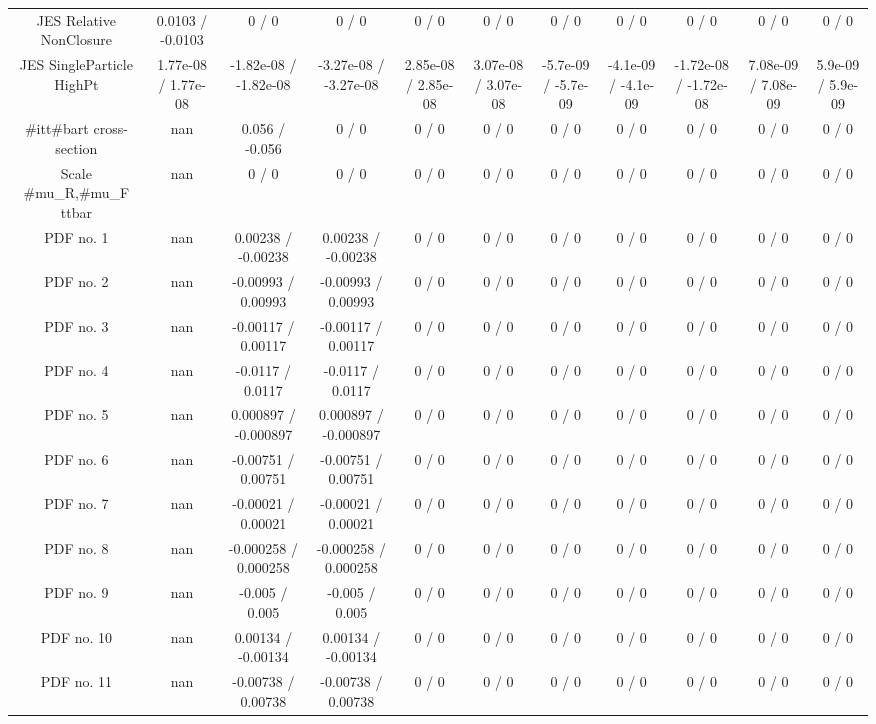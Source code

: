 \begin{table}[htbp]
\begin{center}
\begin{tabular}{|c|c|c|c|c|c|c|c|c|c|c|}
  JES Relative NonClosure & 0.0103 / -0.0103 & 0 / 0 & 0 / 0 & 0 / 0 & 0 / 0 & 0 / 0 & 0 / 0 & 0 / 0 & 0 / 0 & 0 / 0 \\ 
  JES SingleParticle HighPt & 1.77e-08 / 1.77e-08 & -1.82e-08 / -1.82e-08 & -3.27e-08 / -3.27e-08 & 2.85e-08 / 2.85e-08 & 3.07e-08 / 3.07e-08 & -5.7e-09 / -5.7e-09 & -4.1e-09 / -4.1e-09 & -1.72e-08 / -1.72e-08 & 7.08e-09 / 7.08e-09 & 5.9e-09 / 5.9e-09 \\ 
  #it{t#bar{t}} cross-section &    nan    & 0.056 / -0.056 & 0 / 0 & 0 / 0 & 0 / 0 & 0 / 0 & 0 / 0 & 0 / 0 & 0 / 0 & 0 / 0 \\ 
  Scale #mu_{R},#mu_{F} ttbar &    nan    & 0 / 0 & 0 / 0 & 0 / 0 & 0 / 0 & 0 / 0 & 0 / 0 & 0 / 0 & 0 / 0 & 0 / 0 \\ 
  PDF no. 1 &    nan    & 0.00238 / -0.00238 & 0.00238 / -0.00238 & 0 / 0 & 0 / 0 & 0 / 0 & 0 / 0 & 0 / 0 & 0 / 0 & 0 / 0 \\ 
  PDF no. 2 &    nan    & -0.00993 / 0.00993 & -0.00993 / 0.00993 & 0 / 0 & 0 / 0 & 0 / 0 & 0 / 0 & 0 / 0 & 0 / 0 & 0 / 0 \\ 
  PDF no. 3 &    nan    & -0.00117 / 0.00117 & -0.00117 / 0.00117 & 0 / 0 & 0 / 0 & 0 / 0 & 0 / 0 & 0 / 0 & 0 / 0 & 0 / 0 \\ 
  PDF no. 4 &    nan    & -0.0117 / 0.0117 & -0.0117 / 0.0117 & 0 / 0 & 0 / 0 & 0 / 0 & 0 / 0 & 0 / 0 & 0 / 0 & 0 / 0 \\ 
  PDF no. 5 &    nan    & 0.000897 / -0.000897 & 0.000897 / -0.000897 & 0 / 0 & 0 / 0 & 0 / 0 & 0 / 0 & 0 / 0 & 0 / 0 & 0 / 0 \\ 
  PDF no. 6 &    nan    & -0.00751 / 0.00751 & -0.00751 / 0.00751 & 0 / 0 & 0 / 0 & 0 / 0 & 0 / 0 & 0 / 0 & 0 / 0 & 0 / 0 \\ 
  PDF no. 7 &    nan    & -0.00021 / 0.00021 & -0.00021 / 0.00021 & 0 / 0 & 0 / 0 & 0 / 0 & 0 / 0 & 0 / 0 & 0 / 0 & 0 / 0 \\ 
  PDF no. 8 &    nan    & -0.000258 / 0.000258 & -0.000258 / 0.000258 & 0 / 0 & 0 / 0 & 0 / 0 & 0 / 0 & 0 / 0 & 0 / 0 & 0 / 0 \\ 
  PDF no. 9 &    nan    & -0.005 / 0.005 & -0.005 / 0.005 & 0 / 0 & 0 / 0 & 0 / 0 & 0 / 0 & 0 / 0 & 0 / 0 & 0 / 0 \\ 
  PDF no. 10 &    nan    & 0.00134 / -0.00134 & 0.00134 / -0.00134 & 0 / 0 & 0 / 0 & 0 / 0 & 0 / 0 & 0 / 0 & 0 / 0 & 0 / 0 \\ 
  PDF no. 11 &    nan    & -0.00738 / 0.00738 & -0.00738 / 0.00738 & 0 / 0 & 0 / 0 & 0 / 0 & 0 / 0 & 0 / 0 & 0 / 0 & 0 / 0 \\ 

\end{tabular}
\end{center}
\end{table}
